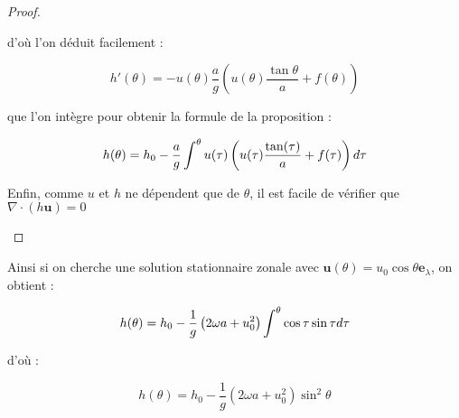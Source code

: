 \begin{proof}
\begin{itemize}
d'où l'on déduit facilement :

\begin{equation}
h'(\theta) = - u(\theta) \dfrac{a}{g} \left( u(\theta) \dfrac{\tan \theta}{a} + f(\theta) \right)
\end{equation}

que l'on intègre pour obtenir la formule de la proposition :

\begin{equation}
h(\theta) = h_0 - \dfrac{a}{g} \displaystyle\int^{\theta} u(\tau) \left( u(\tau) \dfrac{\tan (\tau)}{a} + f(\tau) \right) d\tau
\end{equation}

Enfin, comme $u$ et $h$ ne dépendent que de $\theta$, il est facile de vérifier que $\nabla \cdot \left( h \mathbf{u} \right)=0$
\end{itemize}
\end{proof}

Ainsi si on cherche une solution stationnaire zonale avec $\mathbf{u}(\theta) = u_0 \cos \theta \mathbf{e}_{\lambda}$, on obtient :

\begin{equation}
h(\theta) = h_0 - \dfrac{1}{g}\left( 2 \omega a + u_0^2 \right) \displaystyle\int^{\theta} \cos \tau \sin \tau d \tau
\end{equation}

d'où :

\begin{equation}
h(\theta) = h_0 - \dfrac{1}{g} \left( 2 \omega a + u_0^2 \right) \sin^2 \theta
\end{equation}




